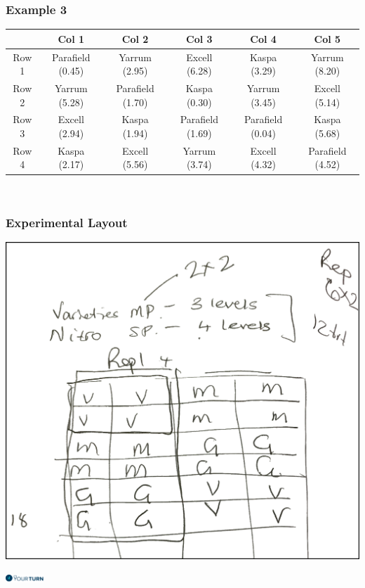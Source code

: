 \begin{frame}\frametitle{Example 3}
\footnotesize
\begin{center}
\begin{tabular}{|c|c|c|c|c|c|}
  \hline
   & Col 1 & Col 2 & Col 3 & Col 4 & Col 5 \\
  \hline
  Row 1 & Parafield (0.45) & Yarrum (2.95) & Excell (6.28) & Kaspa (3.29) & Yarrum (8.20) \\
  \hline
  Row 2 & Yarrum (5.28) & Parafield (1.70) & Kaspa (0.30) & Yarrum (3.45) & Excell (5.14) \\
  \hline
  Row 3 & Excell (2.94) & Kaspa (1.94) & Parafield (1.69) & Parafield (0.04) & Kaspa (5.68) \\
  \hline
  Row 4 & Kaspa (2.17) & Excell (5.56) & Yarrum (3.74) & Excell (4.32) & Parafield (4.52) \\
  \hline
\end{tabular} \\
\end{center}

\end{frame}


\begin{frame}\frametitle{Experimental Layout}

\begin{center}
\includegraphics[height = 0.7\textheight]{exptlayout.png}
\end{center}
\flushright
\includegraphics[height = 0.3cm]{yourturn}
\end{frame}


